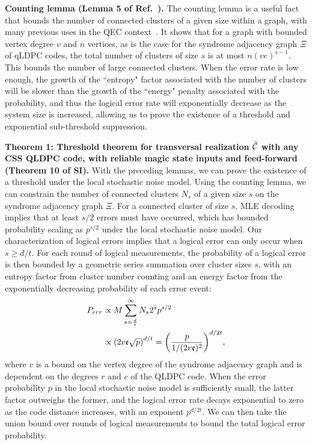 \textbf{Counting lemma (Lemma 5 of Ref.~\cite{gottesman2013fault}).}
%
The counting lemma is a useful fact that bounds the number of connected clusters of a given size within a graph, with many previous uses in the QEC context~\cite{aliferis2007accuracy,bombin2015single,kovalev2013fault,gottesman2013fault,kubica2022single}.
%
It shows that for a graph with bounded vertex degree $v$ and $n$ vertices, as is the case for the syndrome adjacency graph $\Xi$ of qLDPC codes, the total number of clusters of size $s$ is at most $n(ve)^{s-1}$.
%
This bounds the number of large connected clusters.
%
When the error rate is low enough, the growth of the ``entropy" factor associated with the number of clusters will be slower than the growth of the ``energy" penalty associated with the probability, and thus the logical error rate will exponentially decrease as the system size is increased, allowing us to prove the existence of a threshold and exponential sub-threshold suppression.

\textbf{Theorem 1: Threshold theorem for transversal realization $\tilde{\mathcal{C}}$ with any CSS QLDPC code, with reliable magic state inputs and feed-forward (Theorem 10 of SI).}
%
With the preceding lemmas, we can prove the existence of a threshold under the local stochastic noise model.
%
Using the counting lemma, we can constrain the number of connected clusters $N_s$ of a given size $s$ on the syndrome adjacency graph $\Xi$.
%
For a connected cluster of size $s$, MLE decoding implies that at least $s/2$ errors must have occurred, which has bounded probability scaling as $p^{s/2}$ under the local stochastic noise model.
%
Our characterization of logical errors implies that a logical error can only occur when $s\geq d/t$.
%
For each round of logical measurements, the probability of a logical error is then bounded by a geometric series summation over cluster sizes $s$, with an entropy factor from cluster number counting and an energy factor from the exponentially decreasing probability of each error event:
%
\begin{align}
P_{err}&\propto M\sum_{s=\frac{d}{t}}^{\infty}N_s 2^s p^{s/2}\nonumber\\
&\propto \qty(2v\mathfrak{e}\sqrt{p})^{d/t}
=\qty(\frac{p}{1/(2v\mathfrak{e})^2})^{d/2t},
\end{align}
where $v$ is a bound on the vertex degree of the syndrome adjacency graph and is dependent on the degrees $r$ and $c$ of the QLDPC code.
%
When the error probability $p$ in the local stochastic noise model is sufficiently small, the latter factor outweighs the former, and the logical error rate decays exponential to zero as the code distance increases, with an exponent $p^{d/2t}$.
%
We can then take the union bound over rounds of logical measurements to bound the total logical error probability.

